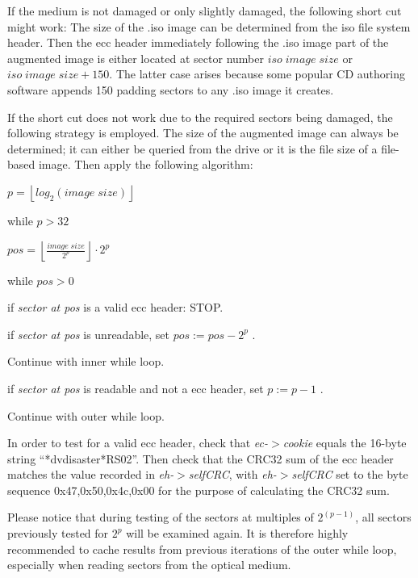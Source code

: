 \smallskip

If the medium is not damaged or only slightly damaged, the following
short cut might work: The size of the .iso image can be determined
from the iso file system header. Then the ecc header immediately
following the .iso image part of the augmented image is either
located at sector number $iso\;image\;size$ or $iso\;image\;size + 150$.
The latter case arises because some popular CD authoring software
appends 150 padding sectors to any .iso image it creates. 

\smallskip

If the short cut does not work due to the required sectors being damaged,
the following strategy is employed. The size of the augmented image
can always be determined; it can either be queried from the drive or
it is the file size of a file-based image. Then apply the following
algorithm:

\bigskip

$p = \left\lfloor log_2(image\; size)\right\rfloor$

while $p > 32$

\quad $pos = \left\lfloor\frac{image\; size}{2^p}\right\rfloor \cdot 2^p$

\smallskip

\quad while $pos > 0$

\qquad if {\em sector at pos} is a valid ecc header: STOP.

\qquad if {\em sector at pos} is unreadable, set $pos := pos - 2^p$ .

\hspace*{13mm} Continue with inner while loop.

\qquad if {\em sector at pos} is readable and not a ecc header, set $p := p -1$ .

\hspace*{13mm} Continue with outer while loop.

\bigskip

In order to test for a valid ecc header, check that {\em ec-$>$cookie}
equals the 16-byte string ``*dvdisaster*RS02''. Then check that the
CRC32 sum of the ecc header matches the value recorded in {\em eh-$>$selfCRC},
with {\em eh-$>$selfCRC} set to the byte sequence 0x47,0x50,0x4c,0x00
for the purpose of calculating the CRC32 sum.

\medskip

Please notice that during testing of the sectors at multiples of $2^{(p-1)}$,
all sectors previously tested for $2^p$ will be examined again. It is therefore
highly recommended to cache results from previous iterations of the outer
while loop, especially when reading sectors from the optical medium.



